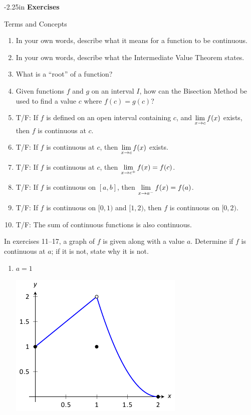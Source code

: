 \begin{adjustwidth*}{}{-2.25in}
\textbf{{\large Exercises}}
\setlength{\columnsep}{25pt}
\begin{multicols*}{2}
\noindent Terms and Concepts \small

\begin{enumerate}[1)]
\item {In your own words, describe what it means for a function to be continuous.}
\item {In your own words, describe what the Intermediate Value Theorem states.}
\item {What is a ``root'' of a function?}
\item {Given functions $f$ and $g$ on an interval $I$, how can the Bisection Method be used to find a value $c$ where $f(c) = g(c)$?}
\item {T/F:	If $f$ is defined on an open interval containing $c$, and $\displaystyle \lim_{x\to c}f(x)$ exists, then $f$ is continuous at $c$.}
\item {T/F: If $f$ is continuous at $c$, then $\displaystyle \lim_{x\to c}f(x)$ exists.}
\item {T/F: If $f$ is continuous at $c$, then $\displaystyle \lim_{x\to c^+}f(x) = f(c)$.}
\item {T/F: If $f$ is continuous on $[a,b]$, then $\displaystyle\lim_{x\to a^-}f(x) = f(a)$.}
\item {T/F: If $f$ is continuous on $[0,1)$ and $[1,2)$, then $f$ is continuous on $[0,2)$.}
\item {T/F: The sum of continuous functions is also continuous.}
\end{enumerate} 

 \small

\noindent In exercises 11--17, a graph of $f$ is given along with a value $a$.  Determine if $f$ is continuous at $a$; if it is not, state why it is not.

\begin{enumerate}[1),resume]
\item
{\noindent $a = 1$

\includegraphics[scale=.8]{figures/fig01_04_ex_05}
}


\end{enumerate}
\end{multicols*}
\end{adjustwidth*}
